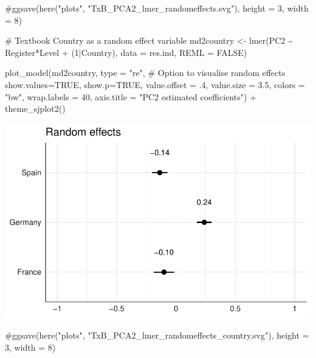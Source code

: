 \documentclass[
  letterpaper,
  DIV=11,
  numbers=noendperiod]{scrreprt}
\newenvironment{Shaded}{\begin{snugshade}}{\end{snugshade}}
\newcommand{\AttributeTok}[1]{\textcolor[rgb]{0.40,0.45,0.13}{#1}}
\newcommand{\CommentTok}[1]{\textcolor[rgb]{0.37,0.37,0.37}{#1}}
\newcommand{\ConstantTok}[1]{\textcolor[rgb]{0.56,0.35,0.01}{#1}}
\newcommand{\DecValTok}[1]{\textcolor[rgb]{0.68,0.00,0.00}{#1}}
\newcommand{\FloatTok}[1]{\textcolor[rgb]{0.68,0.00,0.00}{#1}}
\newcommand{\FunctionTok}[1]{\textcolor[rgb]{0.28,0.35,0.67}{#1}}
\newcommand{\NormalTok}[1]{\textcolor[rgb]{0.00,0.23,0.31}{#1}}
\newcommand{\OtherTok}[1]{\textcolor[rgb]{0.00,0.23,0.31}{#1}}
\newcommand{\SpecialCharTok}[1]{\textcolor[rgb]{0.37,0.37,0.37}{#1}}
\newcommand{\StringTok}[1]{\textcolor[rgb]{0.13,0.47,0.30}{#1}}
\begin{document}
\begin{Shaded}
\begin{Highlighting}[]
\CommentTok{\#ggsave(here("plots", "TxB\_PCA2\_lmer\_randomeffects.svg"), height = 3, width = 8)}

\CommentTok{\# Textbook Country as a random effect variable}
\NormalTok{md2country }\OtherTok{\textless{}{-}} \FunctionTok{lmer}\NormalTok{(PC2 }\SpecialCharTok{\textasciitilde{}}\NormalTok{ Register}\SpecialCharTok{*}\NormalTok{Level }\SpecialCharTok{+}\NormalTok{ (}\DecValTok{1}\SpecialCharTok{|}\NormalTok{Country), }\AttributeTok{data =}\NormalTok{ res.ind, }\AttributeTok{REML =} \ConstantTok{FALSE}\NormalTok{)}

\FunctionTok{plot\_model}\NormalTok{(md2country, }
           \AttributeTok{type =} \StringTok{"re"}\NormalTok{, }\CommentTok{\# Option to visualise random effects}
           \AttributeTok{show.values=}\ConstantTok{TRUE}\NormalTok{, }
           \AttributeTok{show.p=}\ConstantTok{TRUE}\NormalTok{,}
           \AttributeTok{value.offset =}\NormalTok{ .}\DecValTok{4}\NormalTok{,}
           \AttributeTok{value.size =} \FloatTok{3.5}\NormalTok{,}
           \AttributeTok{colors =} \StringTok{"bw"}\NormalTok{,}
           \AttributeTok{wrap.labels =} \DecValTok{40}\NormalTok{,}
           \AttributeTok{axis.title =} \StringTok{"PC2 estimated coefficients"}\NormalTok{) }\SpecialCharTok{+}
  \FunctionTok{theme\_sjplot2}\NormalTok{()}
\end{Highlighting}
\end{Shaded}

\includegraphics{AppendixF_files/figure-pdf/Dim2random-2.pdf}

\begin{Shaded}
\begin{Highlighting}[]
\CommentTok{\#ggsave(here("plots", "TxB\_PCA2\_lmer\_randomeffects\_country.svg"), height = 3, width = 8)}
\end{Highlighting}
\end{Shaded}
\end{document}

